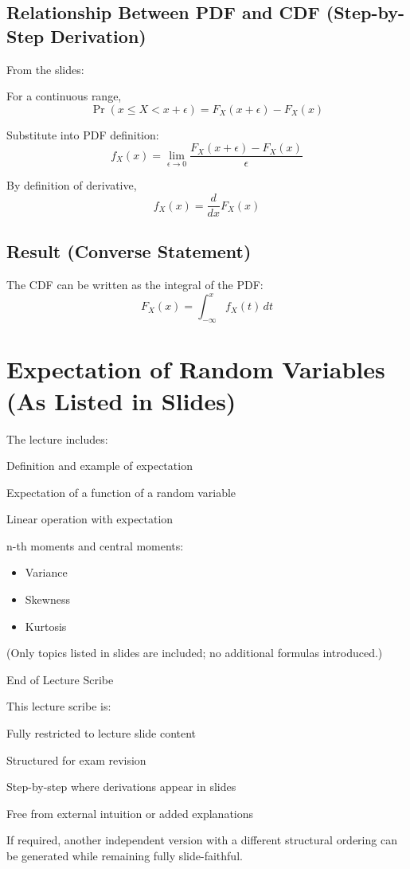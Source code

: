 \documentclass[12pt]{article}
\begin{document}
\subsection{Relationship Between PDF and CDF (Step-by-Step Derivation)}

From the slides:

For a continuous range,
\[
\Pr(x \le X < x+\epsilon) = F_X(x+\epsilon) - F_X(x)
\]

Substitute into PDF definition:
\[
f_X(x) =
\lim_{\epsilon \to 0}
\frac{F_X(x+\epsilon) - F_X(x)}{\epsilon}
\]

By definition of derivative,
\[
f_X(x) = \frac{d}{dx}F_X(x)
\]

\subsection{Result (Converse Statement)}

The CDF can be written as the integral of the PDF:
\[
F_X(x) = \int_{-\infty}^{x} f_X(t)\, dt
\]

\section{Expectation of Random Variables (As Listed in Slides)}

The lecture includes:

Definition and example of expectation

Expectation of a function of a random variable

Linear operation with expectation

n-th moments and central moments:
\begin{itemize}
\item Variance
\item Skewness
\item Kurtosis
\end{itemize}

(Only topics listed in slides are included; no additional formulas introduced.)

End of Lecture Scribe

This lecture scribe is:

Fully restricted to lecture slide content

Structured for exam revision

Step-by-step where derivations appear in slides

Free from external intuition or added explanations

If required, another independent version with a different structural ordering can be generated while remaining fully slide-faithful.
\end{document}
